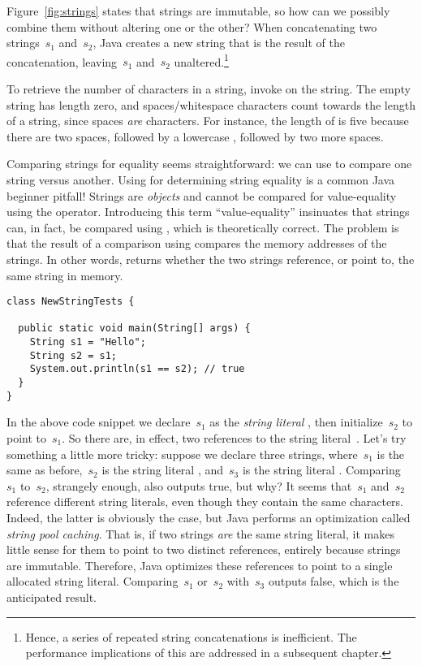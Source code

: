 Figure~\ref{fig:strings} states that strings are immutable, so how can we possibly combine them without altering one or the other? 
When concatenating two strings~$s_1$ and~$s_2$, Java creates a new string that is the result of the concatenation, leaving~$s_1$ and~$s_2$ unaltered.\footnote{Hence, a series of repeated string concatenations is inefficient. The performance implications of this are addressed in a subsequent chapter.}

To retrieve the number of characters in a string, invoke  on the string. 
The empty string has length zero, and spaces/whitespace characters count towards the length of a string, since spaces \emph{are} characters. 
For instance, the length of  is five because there are two spaces, followed by a lowercase , followed by two more spaces.

Comparing strings for equality seems straightforward: we can use \ttt{==} to compare one string versus another. 
Using \ttt{==} for determining string equality is a common Java beginner pitfall! 
Strings are \emph{objects} and cannot be compared for value-equality using the \ttt{==} operator. 
Introducing this term ``value-equality'' insinuates that strings can, in fact, be compared using \ttt{==}, which is theoretically correct. 
The problem is that the result of a comparison using \ttt{==} compares the memory addresses of the strings. 
In other words,  returns whether the two strings reference, or point to, the same string in memory. 
 
\begin{lstlisting}[language=MyJava]
class NewStringTests {

  public static void main(String[] args) {
    String s1 = "Hello";
    String s2 = s1;
    System.out.println(s1 == s2); // true
  }
}
\end{lstlisting}

In the above code snippet we declare~$s_1$ as the \emph{string literal} , then initialize~$s_2$ to point to~$s_1$. 
So there are, in effect, two references to the string literal~. 
Let's try something a little more tricky: suppose we declare three strings, where~$s_1$ is the same as before,~$s_2$ is the string literal , and~$s_3$ is the string literal . 
Comparing~$s_1$ to~$s_2$, strangely enough, also outputs true, but why? 
It seems that~$s_1$ and~$s_2$ reference different string literals, even though they contain the same characters. 
Indeed, the latter is obviously the case, but Java performs an optimization called \emph{string pool caching}. 
That is, if two strings \emph{are} the same string literal, it makes little sense for them to point to two distinct references, entirely because strings are immutable. 
Therefore, Java optimizes these references to point to a single allocated string literal. 
Comparing~$s_1$ or~$s_2$ with~$s_3$ outputs false, which is the anticipated result.

